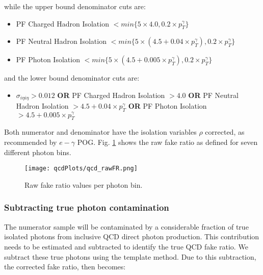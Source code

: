 while the upper bound denominator cuts are:

\begin{itemize}
\item PF Charged Hadron Isolation $ < min\{5\times4.0,0.2\times p_{T}^{\gamma}\}$
\item PF Neutral Hadron Isolation $ < min\{5\times(4.5+0.04\times p_{T}^{\gamma}), 0.2\times p_{T}^{\gamma}\}$
\item PF Photon Isolation $ < min\{5\times(4.5+0.005\times p_{T}^{\gamma}), 0.2\times p_{T}^{\gamma}\}$
\end{itemize}

and the lower bound denominator cuts are:

\begin{itemize}
\item $\sigma_{i\eta i\eta} > 0.012 $ \newline
\textbf{OR}  PF Charged Hadron Isolation $ > 4.0$ \newline
\textbf{OR}  PF Neutral Hadron Isolation $ > 4.5+0.04\times p_{T}^{\gamma}$ \newline
\textbf{OR}  PF Photon Isolation $ > 4.5+0.005\times p_{T}^{\gamma}$
\end{itemize}

Both numerator and denominator have the isolation variables $\rho$ corrected, as recommended by $e-\gamma$ POG.
Fig. \ref{fig:rawFR} shows the raw fake ratio as defined for seven different photon \pt bins.

\begin{figure}[hbtp]
\begin{center}
\texttt{[image: qcdPlots/qcd\_rawFR.png]}
\caption{Raw fake ratio values per photon \et bin.}
\label{fig:rawFR}
\end{center}
\end{figure}

\subsubsection{Subtracting true photon contamination}

The numerator sample will be contaminated by a considerable fraction of true isolated photons from inclusive QCD direct photon production. This contribution needs to be estimated and subtracted to identify the true QCD fake ratio. We subtract these true photons using the template method. Due to this subtraction, the corrected fake ratio, then becomes:

